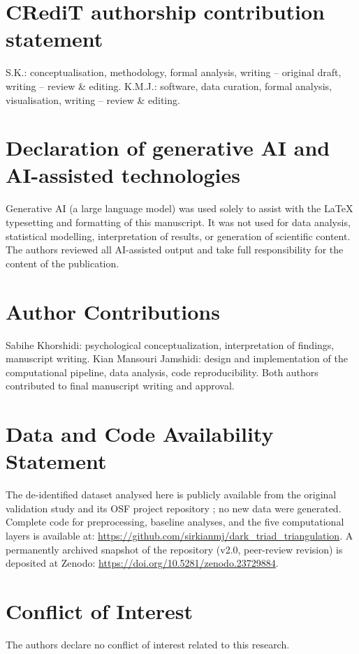 \documentclass[11pt,twocolumn]{article}
\begin{document}
\section*{CRediT authorship contribution statement}
S.K.: conceptualisation, methodology, formal analysis, writing -- original draft, writing -- review \& editing.
K.M.J.: software, data curation, formal analysis, visualisation, writing -- review \& editing.

\section*{Declaration of generative AI and AI-assisted technologies}
Generative AI (a large language model) was used solely to assist with the LaTeX typesetting and formatting of this manuscript. It was not used for data analysis, statistical modelling, interpretation of results, or generation of scientific content. The authors reviewed all AI-assisted output and take full responsibility for the content of the publication.

\section*{Author Contributions}
Sabihe Khorshidi: psychological conceptualization, interpretation of findings, manuscript writing. Kian Mansouri Jamshidi: design and implementation of the computational pipeline, data analysis, code reproducibility. Both authors contributed to final manuscript writing and approval.

\section*{Data and Code Availability Statement}
The de-identified dataset analysed here is publicly available from the original validation study \citep{zivna2025} and its OSF project repository \citep{zivna2023osf}; no new data were generated. Complete code for preprocessing, baseline analyses, and the five computational layers is available at: \url{https://github.com/sirkianmj/dark_triad_triangulation}. A permanently archived snapshot of the repository (v2.0, peer-review revision) is deposited at Zenodo: \url{https://doi.org/10.5281/zenodo.23729884}.

\section*{Conflict of Interest}
The authors declare no conflict of interest related to this research.
\end{document}
